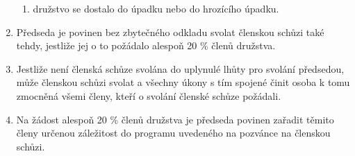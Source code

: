 \begin{enumerate}
\begin{enumerate}[label=\alph*.]
        \item družstvo se dostalo do úpadku nebo do hrozícího úpadku.
    \end{enumerate}
    \item Předseda je povinen bez zbytečného odkladu svolat členskou schůzi také tehdy, jestliže jej o to požádalo alespoň 20 \% členů družstva.
    \item Jestliže není členská schůze svolána do uplynulé lhůty pro svolání předsedou, může členskou schůzi svolat a všechny úkony s tím spojené činit osoba k tomu zmocněná všemi členy, kteří o svolání členské schůze požádali.
    \item Na žádost alespoň 20 \% členů družstva je předseda povinen zařadit těmito členy určenou záležitost do programu uvedeného na pozvánce na členskou schůzi.
\end{enumerate}

